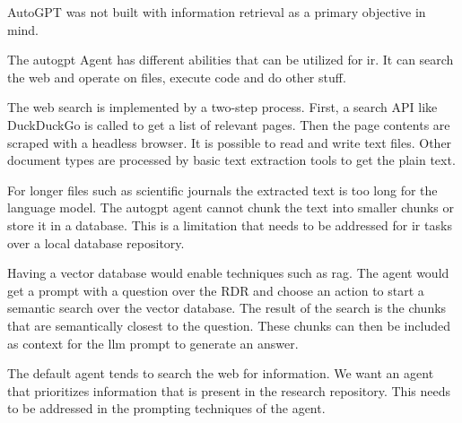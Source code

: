 \documentclass[../main.tex]{subfiles}
\begin{document}
AutoGPT was not built with information retrieval as a primary objective in mind.

The \gls{autogpt} Agent has different abilities that can be utilized for \gls{ir}.
It can search the web and operate on files, execute code and do other stuff.

The web search is implemented by a two-step process.
First, a search API like DuckDuckGo is called to get a list of relevant pages.
Then the page contents are scraped with a headless browser.
It is possible to read and write text files.
Other document types are processed by basic text extraction tools to get the plain text.

For longer files such as scientific journals the extracted text is too long for the language model.
The \gls{autogpt} agent cannot chunk the text into smaller chunks or store it in a database.
This is a limitation that needs to be addressed for \gls{ir} tasks over a local database repository.

Having a vector database would enable techniques such as \gls{rag}.
The agent would get a prompt with a question over the RDR and choose an action to start a semantic search over the vector database.
The result of the search is the chunks that are semantically closest to the question.
These chunks can then be included as context for the \gls{llm} prompt to generate an answer.

The default agent tends to search the web for information.
We want an agent that prioritizes information that is present in the research repository.
This needs to be addressed in the prompting techniques of the agent.
\end{document}
